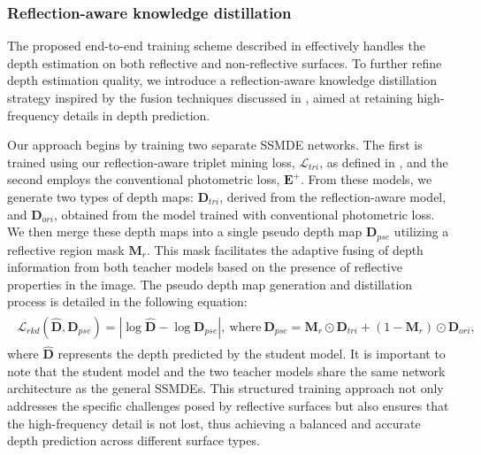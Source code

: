 \subsubsection{Reflection-aware knowledge distillation}
\label{sec:distillation}
The proposed end-to-end training scheme described in  effectively handles the depth estimation on both reflective and non-reflective surfaces.
To further refine depth estimation quality, we introduce a reflection-aware knowledge distillation strategy inspired by the fusion techniques discussed in \citet{shi20233d}, aimed at retaining high-frequency details in depth prediction.

Our approach begins by training two separate SSMDE networks. The first is trained using our reflection-aware triplet mining loss, $\mathcal{L}_{tri}$, as defined in , and the second employs the conventional photometric loss, $\mathbf{E}^{+}$. 
From these models, we generate two types of depth maps: $\mathbf{D}_{tri}$, derived from the reflection-aware model, and $\mathbf{D}_{ori}$, obtained from the model trained with conventional photometric loss. We then merge these depth maps into a single pseudo depth map $\mathbf{D}_{pse}$ utilizing a reflective region mask $\mathbf{M}_r$. This mask facilitates the adaptive fusing of depth information from both teacher models based on the presence of reflective properties in the image. The pseudo depth map generation and distillation process is detailed in the following equation:
\begin{align}
\begin{split}
\mathcal{L}_{rkd}(\hat{\mathbf{D}}, \mathbf{D}_{pse}) = |\log \hat{\mathbf{D}} - \log \mathbf{D}_{pse}|,~
\text{where}~\mathbf{D}_{pse} = \mathbf{M}_r \odot \mathbf{D}_{tri} + (1 - \mathbf{M}_r) \odot \mathbf{D}_{ori},
\end{split}
\end{align}
where $\hat{\mathbf{D}}$ represents the depth predicted by the student model.
It is important to note that the student model and the two teacher models share the same network architecture as the general SSMDEs.
This structured training approach not only addresses the specific challenges posed by reflective surfaces but also ensures that the high-frequency detail is not lost, thus achieving a balanced and accurate depth prediction across different surface types.